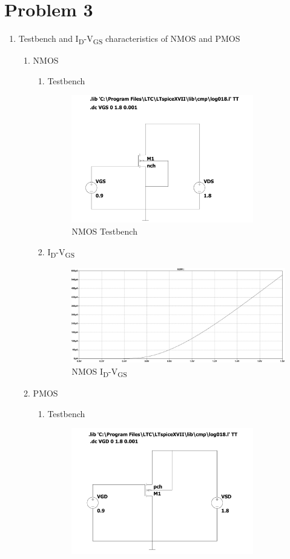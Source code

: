 \documentclass{article}
\begin{document}
\section{Problem 3}
\label{sec:org9375af8}
\begin{enumerate}
\item Testbench and I\textsubscript{D}-V\textsubscript{GS} characteristics of NMOS and PMOS
\begin{enumerate}
\item NMOS
\begin{enumerate}
\item Testbench
\begin{figure}[H]
\centering
\includegraphics[width=300px]{img/q3/a/nmos-testbench.pdf}
\caption{\label{fig:nmos-testbench}NMOS Testbench}
\end{figure}
\item I\textsubscript{D}-V\textsubscript{GS}
\begin{figure}[H]
\centering
\includegraphics[width=.9\linewidth]{img/q3/a/nmos-id-vgs.pdf}
\caption{\label{fig:nmos-id-vgs}NMOS I\textsubscript{D}-V\textsubscript{GS}}
\end{figure}
\end{enumerate}
\item PMOS
\begin{enumerate}
\item Testbench
\begin{figure}[H]
\centering
\includegraphics[width=300px]{img/q3/a/pmos-testbench.pdf}

\end{figure}
\end{enumerate}
\end{enumerate}
\end{enumerate}
\end{document}
